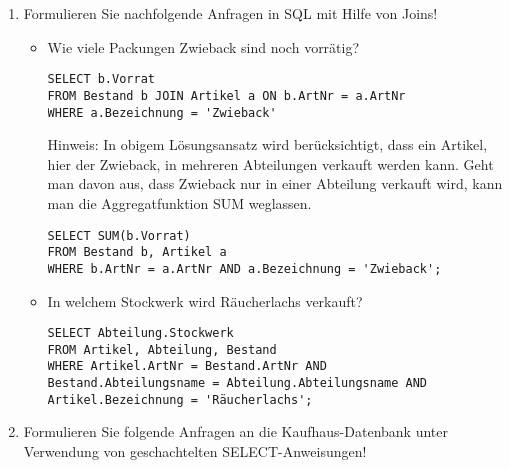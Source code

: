 \documentclass{lehramt-informatik}
\begin{document}
\begin{enumerate}


\item Formulieren Sie nachfolgende Anfragen in SQL mit Hilfe von Joins!

\begin{itemize}


\item Wie viele Packungen Zwieback sind noch vorrätig?

\begin{antwort}[richtig]
\begin{verbatim}
SELECT b.Vorrat
FROM Bestand b JOIN Artikel a ON b.ArtNr = a.ArtNr
WHERE a.Bezeichnung = 'Zwieback'
\end{verbatim}
\end{antwort}

\begin{antwort}[muster]
Hinweis: In obigem Lösungsansatz wird berücksichtigt, dass ein Artikel,
hier der Zwieback, in mehreren Abteilungen verkauft werden kann. Geht
man davon aus, dass Zwieback nur in einer Abteilung verkauft wird, kann
man die Aggregatfunktion SUM weglassen.
\begin{verbatim}
SELECT SUM(b.Vorrat)
FROM Bestand b, Artikel a
WHERE b.ArtNr = a.ArtNr AND a.Bezeichnung = 'Zwieback';
\end{verbatim}
\end{antwort}


\item In welchem Stockwerk wird Räucherlachs verkauft?

\begin{antwort}[muster]
\begin{verbatim}
SELECT Abteilung.Stockwerk
FROM Artikel, Abteilung, Bestand
WHERE Artikel.ArtNr = Bestand.ArtNr AND
Bestand.Abteilungsname = Abteilung.Abteilungsname AND
Artikel.Bezeichnung = 'Räucherlachs';
\end{verbatim}
\end{antwort}

\end{itemize}


\item Formulieren Sie folgende Anfragen an die Kaufhaus-Datenbank unter
Verwendung von geschachtelten SELECT-Anweisungen!


\end{enumerate}
\end{document}
